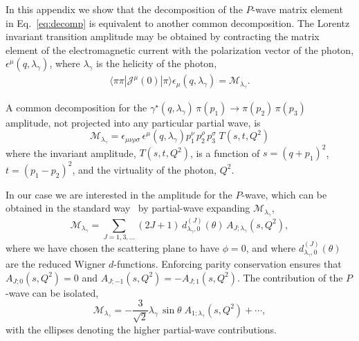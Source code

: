 {\raul

In this appendix we show that the decomposition of the $P$-wave matrix element in Eq.~\ref{eq:decomp} is equivalent to another common decomposition. The Lorentz invariant transition amplitude may be obtained by contracting the matrix element of the electromagnetic current with the polarization vector of the photon, $\epsilon^\mu(q,\lambda_\gamma)$, where $\lambda_\gamma$ is the helicity of the photon,
\begin{align}
{\langle \pi\pi|{\mathcal{J}}^{\mu}(0)| \pi\rangle}\epsilon_\mu(q,\lambda_\gamma)=
\mathcal{M}_{\lambda_\gamma}.
\end{align}


A common decomposition for the  ${\gamma^\star(q, \lambda_\gamma)\, \pi(p_1) \to \pi(p_2)\, \pi(p_3)}$ amplitude, not projected into any particular partial wave, is
\begin{equation}
\mathcal{M}_{\lambda_\gamma} = \epsilon_{\mu \nu \rho \sigma}\,  \epsilon^\mu(q,\lambda_\gamma) p_1^\nu \, p_2^\rho \, p_3^\sigma \; T(s,t,Q^2) \label{pipi_invar}
\end{equation}
where the invariant amplitude, $T(s,t,Q^2)$, is a function of $s = (q+p_1)^2$, $t = (p_1 - p_2)^2 $, and the virtuality of the photon, $Q^2$.

In our case we are interested in the amplitude for the $P$-wave, which can be obtained in the standard way~\cite{Jacob:1959at, Danilkin:2014cra} by partial-wave expanding $\mathcal{M}_{\lambda_\gamma}$,
\begin{equation}
\mathcal{M}_{\lambda_\gamma}=\sum_{J=1,3,\ldots} (2J+1) \, d^{(J)}_{\lambda_\gamma, 0}(\theta) \, A_{J; \lambda_\gamma}(s,Q^2),
\end{equation}
where we have chosen the scattering plane to have $\phi=0$, and where $d^{(J)}_{\lambda_\gamma, 0}(\theta)$ are the reduced Wigner $d$-functions. Enforcing parity conservation ensures that $A_{J; 0}(s,Q^2)=0$ and $A_{J; -1}(s,Q^2)=-A_{J; 1}(s,Q^2)$. The contribution of the $P$-wave can be isolated,
\begin{equation}
\mathcal{M}_{\lambda_\gamma}=-\frac{3}{\sqrt{2}} \lambda_\gamma \, \sin \theta \; A_{1; \lambda_\gamma}(s,Q^2) +\cdots,
\label{eq:MatPwave}
\end{equation}
with the ellipses denoting the higher partial-wave contributions. 

}

